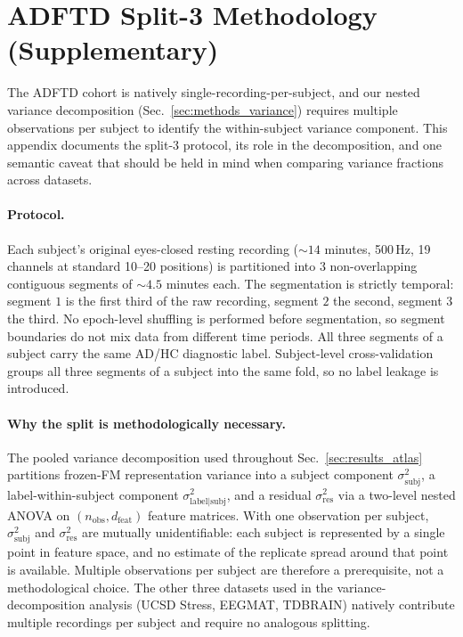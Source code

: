 \section{ADFTD Split-3 Methodology (Supplementary)}
\label{app:adftd_split}

The ADFTD cohort is natively single-recording-per-subject, and our
nested variance decomposition (Sec.~\ref{sec:methods_variance})
requires multiple observations per subject to identify the
within-subject variance component. This appendix documents the
split-3 protocol, its role in the decomposition, and one semantic
caveat that should be held in mind when comparing variance fractions
across datasets.

\paragraph{Protocol.} Each subject's original eyes-closed resting
recording ($\sim\!14$ minutes, 500\,Hz, 19 channels at standard
10--20 positions) is partitioned into $3$ non-overlapping contiguous
segments of $\sim\!4.5$ minutes each. The segmentation is strictly
temporal: segment $1$ is the first third of the raw recording, segment
$2$ the second, segment $3$ the third. No epoch-level shuffling is
performed before segmentation, so segment boundaries do not mix data
from different time periods. All three segments of a subject carry
the same AD/HC diagnostic label. Subject-level cross-validation
groups all three segments of a subject into the same fold, so no
label leakage is introduced.

\paragraph{Why the split is methodologically necessary.} The pooled
variance decomposition used throughout Sec.~\ref{sec:results_atlas}
partitions frozen-FM representation variance into a subject component
$\sigma^2_\text{subj}$, a label-within-subject component
$\sigma^2_\text{label|subj}$, and a residual
$\sigma^2_\text{res}$ via a two-level nested ANOVA on $(n_\text{obs},
d_\text{feat})$ feature matrices. With one observation per subject,
$\sigma^2_\text{subj}$ and $\sigma^2_\text{res}$ are mutually
unidentifiable: each subject is represented by a single point in
feature space, and no estimate of the replicate spread around that
point is available. Multiple observations per subject are therefore
a prerequisite, not a methodological choice. The other three
datasets used in the variance-decomposition analysis (UCSD Stress,
EEGMAT, TDBRAIN) natively contribute multiple recordings per subject
and require no analogous splitting.

